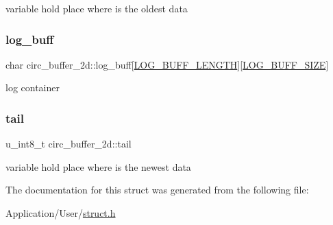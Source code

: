 variable hold place where is the oldest data \mbox{\label{structcirc__buffer__2d_a57d57a0a528f51cf12c93e44f2f2764f}} 
\subsubsection{\texorpdfstring{log\+\_\+buff}{log\_buff}}
{\footnotesize\ttfamily char circ\+\_\+buffer\+\_\+2d\+::log\+\_\+buff\mbox{[}\hyperlink{define_8h_ab476956b4e8a58961a140862e864f62f}{L\+O\+G\+\_\+\+B\+U\+F\+F\+\_\+\+L\+E\+N\+G\+TH}\mbox{]}\mbox{[}\hyperlink{define_8h_a287d5379960755c53cdc87c6ede35c48}{L\+O\+G\+\_\+\+B\+U\+F\+F\+\_\+\+S\+I\+ZE}\mbox{]}}

log container \mbox{\label{structcirc__buffer__2d_ab8e3951213b81cdfd770e7f3593f0cfe}} 
\subsubsection{\texorpdfstring{tail}{tail}}
{\footnotesize\ttfamily u\+\_\+int8\+\_\+t circ\+\_\+buffer\+\_\+2d\+::tail}

variable hold place where is the newest data 

The documentation for this struct was generated from the following file\+:\begin{DoxyCompactItemize}
\item 
Application/\+User/\hyperlink{struct_8h}{struct.\+h}\end{DoxyCompactItemize}
